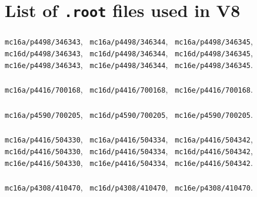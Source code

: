 \section{List of \texttt{.root} files used in V8}
\label{appendix:dsids}

\subsubsection{\tth}
\texttt{mc16a/p4498/346343}, \texttt{ mc16a/p4498/346344}, \texttt{ mc16a/p4498/346345},
\newline \texttt{ mc16d/p4498/346343}, \texttt{ mc16d/p4498/346344}, \texttt{ mc16d/p4498/346345},
\newline \texttt{ mc16e/p4498/346343}, \texttt{ mc16e/p4498/346344}, \texttt{ mc16e/p4498/346345}.

\subsubsection{\ttw}
\texttt{mc16a/p4416/700168}, \texttt{ mc16d/p4416/700168}, \texttt{ mc16e/p4416/700168}.

\subsubsection{\ttwew}
\texttt{mc16a/p4590/700205}, \texttt{ mc16d/p4590/700205}, \texttt{ mc16e/p4590/700205}.

\subsubsection{\ttz}
\texttt{mc16a/p4416/504330}, \texttt{ mc16a/p4416/504334}, \texttt{ mc16a/p4416/504342},
\newline \texttt{ mc16d/p4416/504330}, \texttt{ mc16d/p4416/504334}, \texttt{ mc16d/p4416/504342},
\newline \texttt{ mc16e/p4416/504330}, \texttt{ mc16e/p4416/504334}, \texttt{ mc16e/p4416/504342}.

\subsubsection{\ttbar}
\texttt{mc16a/p4308/410470}, \texttt{ mc16d/p4308/410470}, \texttt{ mc16e/p4308/410470}.

